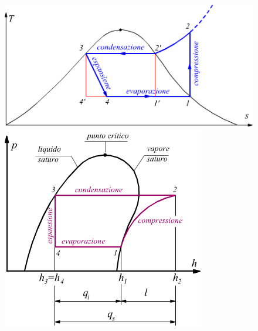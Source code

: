 \begin{figure}[H]
	\centering
	\includegraphics[width=0.4\linewidth]{immagini/cicliinversi1}
	\includegraphics[width=0.4\linewidth]{immagini/cicliinversi2}
	\label{fig:cicliinversi1}
\end{figure}
